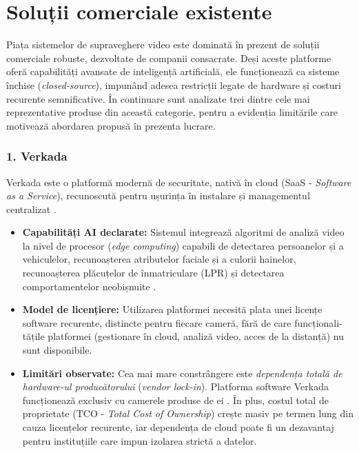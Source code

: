 \documentclass[../../main.tex]{subfiles}
\begin{document}
\section{Soluții comerciale existente}
\label{sec:solutii_comerciale}

Piața sistemelor de supraveghere video este dominată în prezent de soluții comerciale robuste, dezvoltate de companii consacrate. Deși aceste platforme oferă capabilități avansate de inteligență artificială, ele funcționează ca sisteme închise (\emph{closed-source}), impunând adesea restricții legate de hardware și costuri recurente semnificative. În continuare sunt analizate trei dintre cele mai reprezentative produse din această categorie, pentru a evidenția limitările care motivează abordarea propusă în prezenta lucrare.

\subsubsection*{1. Verkada}
Verkada este o platformă modernă de securitate, nativă în cloud (SaaS - \emph{Software as a Service}), recunoscută pentru ușurința în instalare și managementul centralizat \cite{verkada_overview}.
\begin{itemize}
	\item \textbf{Capabilități AI declarate:} Sistemul integrează algoritmi de analiză video la nivel de procesor (\emph{edge computing}) capabili de detectarea persoanelor și a vehiculelor, recunoașterea atributelor faciale și a culorii hainelor, recunoașterea plăcuțelor de înmatriculare (LPR) și detectarea comportamentelor neobișnuite \cite{verkada_overview}.
	\item \textbf{Model de licențiere:} Utilizarea platformei necesită plata unei licențe software recurente, distincte pentru fiecare cameră, fără de care funcționali-tățile platformei (gestionare în cloud, analiză video, acces de la distanță) nu sunt disponibile.
	\item \textbf{Limitări observate:} Cea mai mare constrângere este \emph{dependența totală de hardware-ul producătorului} (\emph{vendor lock-in}). Platforma software \linebreak Verkada funcționează exclusiv cu camerele produse de ei \cite{verkada_security}. În plus, costul total de proprietate (TCO - \emph{Total Cost of Ownership}) crește masiv pe termen lung din cauza licențelor recurente, iar dependența de cloud poate fi un dezavantaj pentru instituțiile care impun izolarea strictă a datelor.
\end{itemize}
\end{document}
